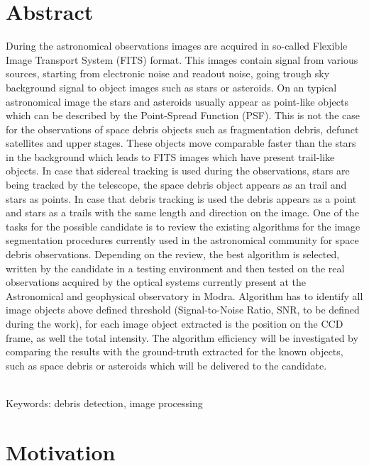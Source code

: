 \documentclass[12pt, a4paper, oneside]{book}
\begin{document}
\chapter*{Abstract}\label{chap:abstract_en}
During the astronomical observations images are acquired in so-called Flexible Image Transport System (FITS) format. This images contain signal from various sources, starting from electronic noise and readout noise, going trough sky background signal to object images such as stars or asteroids. On an typical astronomical image the stars and asteroids usually appear as point-like objects which can be described by the Point-Spread Function (PSF). This is not the case for the observations of space debris objects such as fragmentation debris, defunct satellites and upper stages. These objects move comparable faster than the stars in the background which leads to FITS images which have present trail-like objects. In case that sidereal tracking is used during the observations, stars are being tracked by the telescope, the space debris object appears as an trail and stars as points. In case that debris tracking is used the debris appears as a point and stars as a trails with the same length and direction on the image. One of the tasks for the possible candidate is to review the existing algorithms for the image segmentation procedures currently used in the astronomical community for space debris observations. Depending on the review, the best algorithm is selected, written by the candidate in a testing environment and then tested on the real observations acquired by the optical systems currently present at the Astronomical and geophysical observatory in Modra. Algorithm has to identify all image objects above defined threshold (Signal-to-Noise Ratio, SNR, to be defined during the work), for each image object extracted is the position on the CCD frame, as well the total intensity. The algorithm efficiency will be investigated by comparing the results with the ground-truth extracted for the known objects, such as space debris or asteroids which will be delivered to the candidate.


~\\
Keywords: debris detection, image processing
\vfill\eject

\tableofcontents

\mainmatter

\chapter{Motivation}
\end{document}
